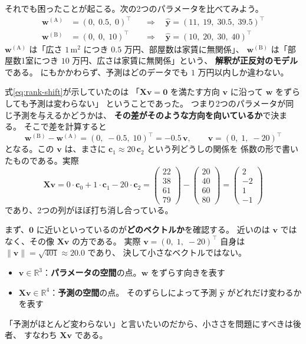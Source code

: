それでも困ったことが起こる。次の2つのパラメータを比べてみよう。
\begin{align*}
  \bm{w}^{(\mathrm{A})} &= (0,\; 0.5,\; 0)^\top
    &&\Rightarrow\quad \hat{\bm{y}} = (11,\; 19,\; 30.5,\; 39.5)^\top \\
  \bm{w}^{(\mathrm{B})} &= (0,\; 0,\; 10)^\top
    &&\Rightarrow\quad \hat{\bm{y}} = (10,\; 20,\; 30,\; 40)^\top
\end{align*}
$\bm{w}^{(\mathrm{A})}$ は「広さ $1\,\mathrm{m}^2$ につき $0.5$ 万円、部屋数は家賃に無関係」、
$\bm{w}^{(\mathrm{B})}$ は「部屋数1室につき $10$ 万円、広さは家賃に無関係」という、
\textbf{解釈が正反対のモデル}である。
にもかかわらず、予測はどのデータでも $1$ 万円以内しか違わない。

式\eqref{eq:rank-shift}が示していたのは
「$\bm{X}\bm{v} = \bm{0}$ を満たす方向 $\bm{v}$ に沿って $\bm{w}$ をずらしても予測は変わらない」
ということであった。
つまり2つのパラメータが同じ予測を与えるかどうかは、
\textbf{その差がそのような方向を向いているか}で決まる。
そこで差を計算すると
\begin{equation*}
  \bm{w}^{(\mathrm{B})} - \bm{w}^{(\mathrm{A})} = (0,\; -0.5,\; 10)^\top
  = -0.5\,\bm{v}, \qquad \bm{v} = (0,\; 1,\; -20)^\top
\end{equation*}
となる。この $\bm{v}$ は、まさに $\bm{c}_1 \approx 20\,\bm{c}_2$ という列どうしの関係を
係数の形で書いたものである。実際
\begin{equation*}
  \bm{X}\bm{v} = 0\cdot\bm{c}_0 + 1\cdot\bm{c}_1 - 20\cdot\bm{c}_2
  = \begin{pmatrix} 22 \\ 38 \\ 61 \\ 79 \end{pmatrix}
  - \begin{pmatrix} 20 \\ 40 \\ 60 \\ 80 \end{pmatrix}
  = \begin{pmatrix} 2 \\ -2 \\ 1 \\ -1 \end{pmatrix}
\end{equation*}
であり、2つの列がほぼ打ち消し合っている。

まず、$\bm{0}$ に近いといっているのが\textbf{どのベクトルか}を確認する。
近いのは $\bm{v}$ ではなく、その像 $\bm{X}\bm{v}$ の方である。
実際 $\bm{v} = (0,\; 1,\; -20)^\top$ 自身は $\|\bm{v}\| = \sqrt{401} \approx 20.0$ であり、
決して小さなベクトルではない。
\begin{itemize}
  \item $\bm{v} \in \mathbb{R}^{3}$：\textbf{パラメータの空間}の点。$\bm{w}$ をずらす向きを表す
  \item $\bm{X}\bm{v} \in \mathbb{R}^{4}$：\textbf{予測の空間}の点。
        そのずらしによって予測 $\hat{\bm{y}}$ がどれだけ変わるかを表す
\end{itemize}
「予測がほとんど変わらない」と言いたいのだから、小ささを問題にすべきは後者、
すなわち $\bm{X}\bm{v}$ である。

